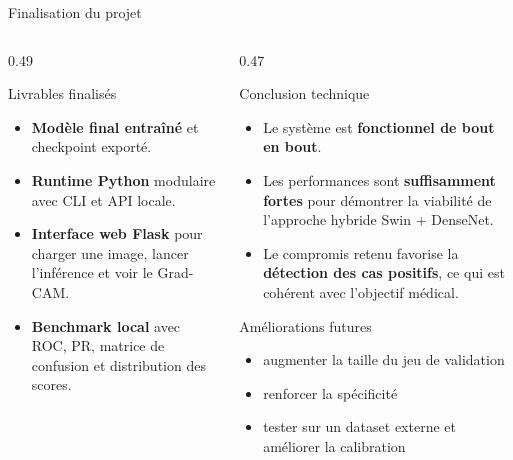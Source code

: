 \begin{frame}{Finalisation du projet}
\scriptsize
\begin{columns}[T,onlytextwidth]
\begin{column}{0.49\textwidth}
\begin{block}{Livrables finalisés}
\begin{itemize}
\item \textbf{Modèle final entraîné} et checkpoint exporté.
\item \textbf{Runtime Python} modulaire avec CLI et API locale.
\item \textbf{Interface web Flask} pour charger une image, lancer l'inférence et voir le Grad-CAM.
\item \textbf{Benchmark local} avec ROC, PR, matrice de confusion et distribution des scores.
\end{itemize}
\end{block}
\end{column}
\begin{column}{0.47\textwidth}
\begin{block}{Conclusion technique}
\begin{itemize}
\item Le système est \textbf{fonctionnel de bout en bout}.
\item Les performances sont \textbf{suffisamment fortes} pour démontrer la viabilité de l'approche hybride Swin + DenseNet.
\item Le compromis retenu favorise la \textbf{détection des cas positifs}, ce qui est cohérent avec l'objectif médical.
\end{itemize}
\end{block}
\begin{block}{Améliorations futures}
\begin{itemize}
\item augmenter la taille du jeu de validation
\item renforcer la spécificité
\item tester sur un dataset externe et améliorer la calibration
\end{itemize}
\end{block}
\end{column}
\end{columns}
\end{frame}

